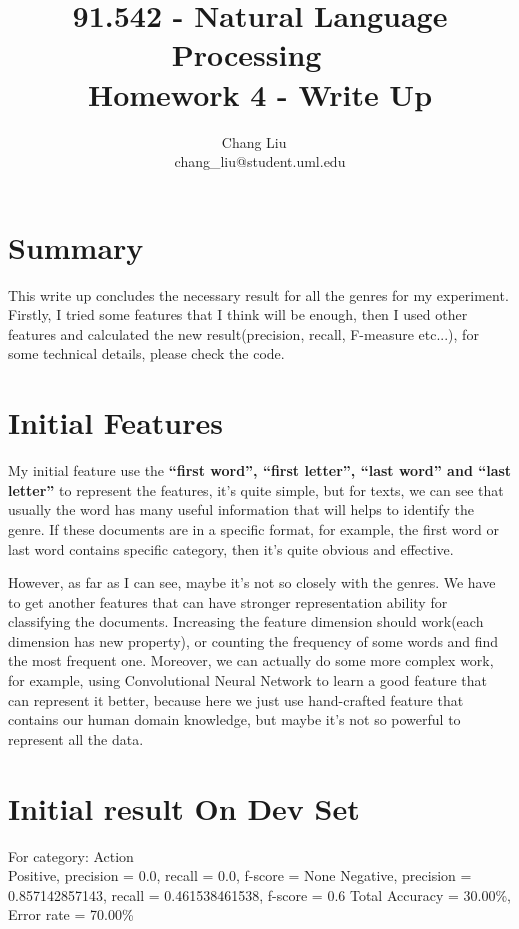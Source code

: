 \documentclass{article}
\title{91.542 - Natural Language Processing ~\\ Homework 4 - Write Up}
\author{Chang Liu ~\\ chang\_liu@student.uml.edu}
\begin{document}
\maketitle

\section{Summary}

This write up concludes the necessary result for all the genres for my experiment. Firstly, I tried some features that I think will be enough, then I used other features and calculated the new result(precision, recall, F-measure etc...), for some technical details, please check the code.


\section{Initial Features}

My initial feature use the \textbf{``first word'', ``first letter'', ``last word'' and ``last letter''} to represent the features, it's quite simple, but for texts, we can see that usually the word has many useful information that will helps to identify the genre. If these documents are in a specific format, for example, the first word or last word contains specific category, then it's quite obvious and effective.

However, as far as I can see, maybe it's not so closely with the genres. We have to get another features that can have stronger representation ability for classifying the documents. Increasing the feature dimension should work(each dimension has new property), or counting the frequency of some words and find the most frequent one. Moreover, we can actually do some more complex work, for example, using Convolutional Neural Network to learn a good feature that can represent it better, because here we just use hand-crafted feature that contains our human domain knowledge, but maybe it's not so powerful to represent all the data.

\section{Initial result On Dev Set}

For category: Action ~\\
Positive, precision = 0.0, recall = 0.0, f-score = None 
Negative, precision = 0.857142857143, recall = 0.461538461538, f-score = 0.6 
Total Accuracy = 30.00\%, Error rate = 70.00\%
\end{document}
